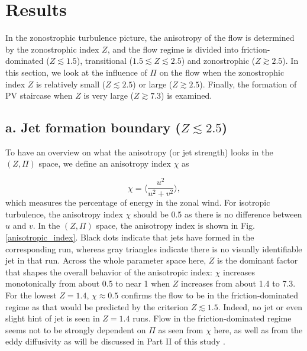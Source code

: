 \documentclass{ametsoc}
\begin{document}
\section{Results}

In the zonostrophic turbulence picture, the anisotropy of the flow is
determined by the zonostrophic index $Z$, and the flow regime is
divided into friction-dominated ($Z\apprle1.5$), transitional ($1.5\apprle Z\apprle2.5$)
and zonostrophic ($Z\apprge2.5$). In this section, we look at the
influence of $\Pi$ on the flow when the zonostrophic index $Z$ is
relatively small ($Z\apprle2.5$) or large ($Z\apprge2.5$). Finally,
the formation of PV staircase when $Z$ is very large ($Z\apprge7.3$)
is examined.


\subsection*{a. Jet formation boundary ($Z\apprle2.5$)}

To have an overview on what the anisotropy (or jet strength) looks
in the $(Z,\Pi)$ space, we define an anisotropy index $\chi$ as

\[
\chi=\langle\frac{u^{2}}{u^{2}+v^{2}}\rangle,
\]
which measures the percentage of energy in the zonal wind. For
isotropic turbulence, the anisotropy index $\chi$ should be 0.5
as there is no difference between $u$ and $v$. In the $(Z,\Pi)$
space, the anisotropy index is shown in Fig. \ref{anisotropic_index}.
Black dots indicate that jets have formed in the corresponding run,
whereas gray triangles indicate there is no visually identifiable
jet in that run. Across the whole parameter space here, $Z$ is the
dominant factor that shapes the overall behavior of the anisotropic
index: $\chi$ increases monotonically from about 0.5 to near 1 when
$Z$ increases from about 1.4 to 7.3. For the lowest $Z=1.4$, $\chi\approx0.5$
confirms the flow to be in the friction-dominated regime as that would
be predicted by the criterion $Z\apprle1.5$. Indeed, no jet or even
slight hint of jet is seen in $Z=1.4$ runs. Flow in the friction-dominated
regime seems not to be strongly dependent on $\Pi$ as seen from $\chi$
here, as well as from the eddy diffusivity as will be discussed in
Part II of this study \citep{Chai2016}.
\end{document}
